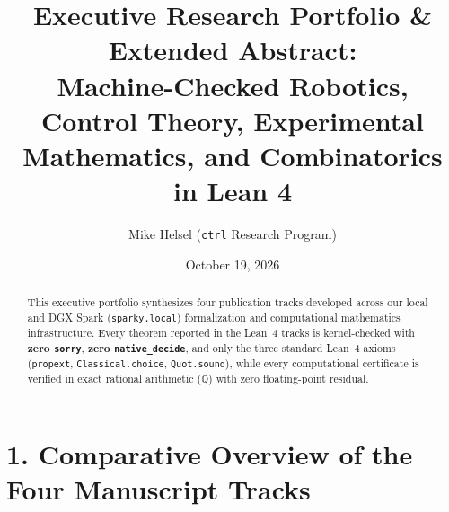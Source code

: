 \documentclass[10pt]{article}
\title{\textbf{Executive Research Portfolio \& Extended Abstract:\\
Machine-Checked Robotics, Control Theory, Experimental Mathematics, and Combinatorics in Lean 4}}
\author{Mike Helsel \quad (\texttt{ctrl} Research Program)}
\date{October 19, 2026}
\begin{document}
\maketitle
\vspace{-1.2em}

\begin{abstract}
\noindent
This executive portfolio synthesizes four publication tracks developed across our local and DGX Spark (\texttt{sparky.local}) formalization and computational mathematics infrastructure. Every theorem reported in the Lean~4 tracks is kernel-checked with \textbf{zero \texttt{sorry}}, \textbf{zero \texttt{native\_decide}}, and only the three standard Lean~4 axioms (\texttt{propext}, \texttt{Classical.choice}, \texttt{Quot.sound}), while every computational certificate is verified in exact rational arithmetic ($\mathbb{Q}$) with zero floating-point residual.
\end{abstract}

\section*{1. Comparative Overview of the Four Manuscript Tracks}
\end{document}
